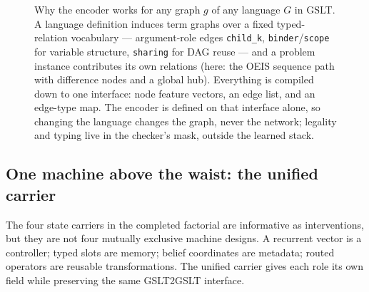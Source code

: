 \documentclass[11pt]{article}
\newcommand{\code}[1]{\texttt{#1}}
\begin{document}
\begin{figure}[htbp]
{}
\caption{Why the encoder works for any graph $g$ of any language $G$ in GSLT. A language
definition induces term graphs over a fixed typed-relation vocabulary --- argument-role
edges \code{child\_k}, \code{binder}/\code{scope} for variable structure, \code{sharing}
for DAG reuse --- and a problem instance contributes its own relations (here: the OEIS
sequence path with difference nodes and a global hub). Everything is compiled down to one
interface: node feature vectors, an edge list, and an edge-type map. The encoder is
defined on that interface alone, so changing the language changes the graph, never the
network; legality and typing live in the checker's mask, outside the learned stack.}
\label{fig:graphinterface}
\end{figure}

\subsection{One machine above the waist: the unified carrier}
\label{sec:unified}

The four state carriers in the completed factorial are informative as interventions, but
they are not four mutually exclusive machine designs. A recurrent vector is a controller;
typed slots are memory; belief coordinates are metadata; routed operators are reusable
transformations. The unified carrier gives each role its own field while preserving the
same GSLT2GSLT interface.
\end{document}
